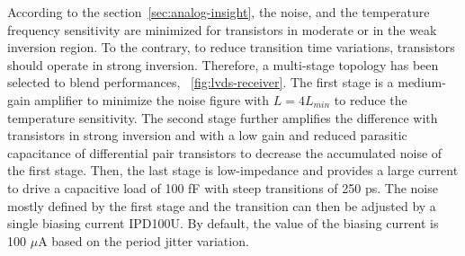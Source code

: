 According to the section~\ref{sec:analog-insight}, the noise, and the temperature frequency sensitivity are minimized for transistors in moderate or in the weak inversion region. To the contrary, to reduce transition time variations, transistors should operate in strong inversion. Therefore, a multi-stage topology has been selected to blend performances, \figurename~\ref{fig:lvds-receiver}. The first stage is a medium-gain amplifier to minimize the noise figure with $L=4L_{min}$ to reduce the temperature sensitivity. The second stage further amplifies the difference with transistors in strong inversion and with a low gain and reduced parasitic capacitance of differential pair transistors to decrease the accumulated noise of the first stage. Then, the last stage is low-impedance and provides a large current to drive a capacitive load of 100 fF with steep transitions of 250 ps. The noise mostly defined by the first stage and the transition can then be adjusted by a single biasing current IPD100U. By default, the value of the biasing current is 100 $\mu$A based on the period jitter variation.


